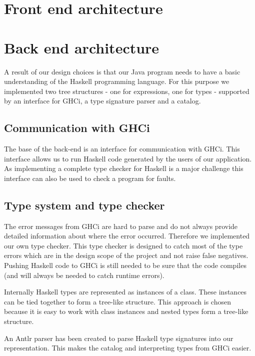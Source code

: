 \section{Front end architecture}

\section{Back end architecture}

A result of our design choices is that our Java program needs to have a basic understanding of the Haskell programming
language. For this purpose we implemented two tree structures - one for expressions, one for types - supported by an
interface for GHCi, a type signature parser and a catalog.

\subsection{Communication with GHCi}
\label{GHCi}

The base of the back-end is an interface for communication with GHCi. This interface allows us to run Haskell code
generated by the users of our application. As implementing a complete type checker for Haskell is a major challenge this
interface can also be used to check a program for faults.

\subsection{Type system and type checker}

The error messages from GHCi are hard to parse and do not always provide detailed information about where the error
occurred. Therefore we implemented our own type checker. This type checker is designed to catch most of the type errors 
which are in the design scope of the project and not raise false negatives. Pushing Haskell code to GHCi is still needed
to be sure that the code compiles (and will always be needed to catch runtime errors).

Internally Haskell types are represented as instances of a class. These instances can be tied together to form a
tree-like structure. This approach is chosen because it is easy to work with class instances and nested types form
a tree-like structure. 

An Antlr parser has been created to parse Haskell type signatures into our representation. This makes the catalog and interpreting types from GHCi easier.

